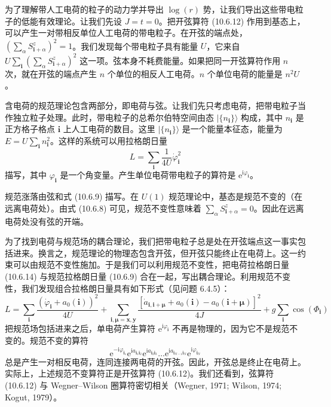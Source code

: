 为了理解带人工电荷的粒子的动力学并导出 $\log(r)$ 势，让我们导出这些带电粒子的低能有效理论。让我们先设 $J=t=0$。把开弦算符 (10.6.12) 作用到基态上，可以产生一对带相反单位人工电荷的带电粒子。在开弦的端点处，$(\sum_{\alpha}S^{z}_{\pmb i+\alpha})^{2}=1$。我们发现每个带电粒子具有能量 $U$，它来自 $U\sum_{\pmb i}(\sum_{\alpha}S^{z}_{\pmb i+\alpha})^{2}$ 这一项。弦本身不耗费能量。如果把同一开弦算符作用 $n$ 次，就在开弦的端点产生 $n$ 个单位的相反人工电荷。$n$ 个单位电荷的能量是 $n^{2}U$。

含电荷的规范理论包含两部分，即电荷与弦。让我们先只考虑电荷，把带电粒子当作独立粒子处理。此时，带电粒子的总希尔伯特空间由态 $|\{n_{\pmb i}\}\rangle$ 构成，其中 $n_{\pmb i}$ 是正方格子格点 $\pmb i$ 上人工电荷的数目。这里 $|\{n_{\pmb i}\}\rangle$ 是一个能量本征态，能量为 $E=U\sum_{\pmb i}n^{2}_{\pmb i}$。这样的系统可以用拉格朗日量
\begin{equation*}
L=\sum_{\pmb i}\frac{1}{4U}\dot{\varphi}^{2}_{\pmb i}\tag{10.6.14}
\end{equation*}
描写，其中 $\varphi_{\pmb i}$ 是一个角变量。产生单位电荷带电粒子的算符是 $\mathrm{e}^{\mathrm{i}\varphi_{\pmb i}}$。

规范涨落由弦和式 (10.6.9) 描写。在 $U(1)$ 规范理论中，基态是规范不变的（在远离电荷处）。由式 (10.6.8) 可见，规范不变性意味着 $\sum_{\alpha}S^{z}_{\pmb i+\alpha}=0$。因此在远离电荷处没有弦的开端。

为了找到电荷与规范场的耦合理论，我们把带电粒子总是处在开弦端点这一事实包括进来。换言之，规范理论的物理态包含开弦，但开弦只能终止在电荷上。这一约束可以由规范不变性施加。于是我们可以利用规范不变性，把电荷拉格朗日量 (10.6.14) 与规范拉格朗日量 (10.6.9) 合在一起，写出耦合理论。利用规范不变性，我们发现组合拉格朗日量具有如下形式（见问题 6.4.5）：
\begin{equation*}
L=\sum_{\pmb i}\frac{(\dot{\varphi}_{\pmb i}+a_0(\pmb i))^{2}}{4U}+\sum_{\pmb i,\pmb\mu=\pmb x,\pmb y}\frac{[\dot{a}_{\pmb i,\pmb i+\pmb\mu}+a_0(\pmb i)-a_0(\pmb i+\pmb\mu)]^{2}}{4J}+g\sum_{\pmb i}\cos(\Phi_{\pmb i})
\end{equation*}
把规范场包括进来之后，单电荷产生算符 $\mathrm{e}^{\mathrm{i}\varphi_{\pmb i}}$ 不再是物理的，因为它不是规范不变的。规范不变的算符
\begin{equation*}
\mathrm{e}^{-\mathrm{i}\varphi_{\pmb i_1}}\mathrm{e}^{\mathrm{i}a_{\pmb i_1\pmb i_2}}\mathrm{e}^{\mathrm{i}a_{\pmb i_2\pmb i_3}}\dots\mathrm{e}^{\mathrm{i}a_{\pmb i_{N-1}\pmb i_N}}\mathrm{e}^{\mathrm{i}\varphi_{\pmb i_N}}
\end{equation*}
总是产生一对相反电荷，连同连接两电荷的开弦。因此，开弦总是终止在电荷上。实际上，上述规范不变算符正是开弦算符 (10.6.12)。我们还看到，弦算符 (10.6.12) 与 Wegner--Wilson 圈算符密切相关（Wegner, 1971; Wilson, 1974; Kogut, 1979）。

